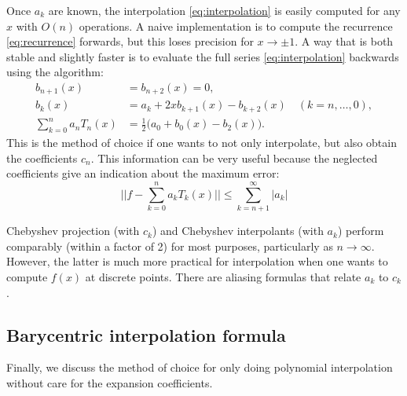 \documentclass{aa}
\begin{document}
Once $a_k$ are known, the interpolation \eqref{eq:interpolation} is easily computed for any $x$ with $O(n)$ operations.
A naive implementation is to compute the recurrence \eqref{eq:recurrence} forwards, but this loses precision for $x \rightarrow \pm 1$.
A way that is both stable and slightly faster is to evaluate the full series \eqref{eq:interpolation} backwards using the \cite{clenshawNoteSummationChebyshev1955} algorithm:
\begin{subequations}
\begin{align}
	b_{n+1}(x) &= b_{n+2}(x) = 0, \\
	b_k(x) &= a_k + 2x b_{k+1}(x) - b_{k+2}(x) \quad (k = n, \ldots, 0), \\
	\textstyle{\sum_{k=0}^n a_n T_n(x)} &= \textstyle{\frac12 \big(a_0 + b_0(x) - b_2(x)\big)}.
\end{align}
\end{subequations}
This is the method of choice if one wants to not only interpolate, but also obtain the coefficients $c_n$.
This information can be very useful because the neglected coefficients give an indication about the maximum error:
\begin{equation}
	\bigg\lvert\bigg\lvert f - \sum_{k=0}^n a_k T_k(x) \bigg\rvert\bigg\rvert \leq \sum_{k=n+1}^\infty \lvert a_k \rvert
\end{equation}

Chebyshev projection (with $c_k$) and Chebyshev interpolants (with $a_k$) perform comparably (within a factor of 2) for most purposes, particularly as $n \rightarrow \infty$.
However, the latter is much more practical for interpolation when one wants to compute $f(x)$ at discrete points.
There are aliasing formulas that relate $a_k$ to $c_k$.

\subsection{Barycentric interpolation formula}

Finally, we discuss the method of choice for only doing polynomial interpolation without care for the expansion coefficients.
\end{document}
